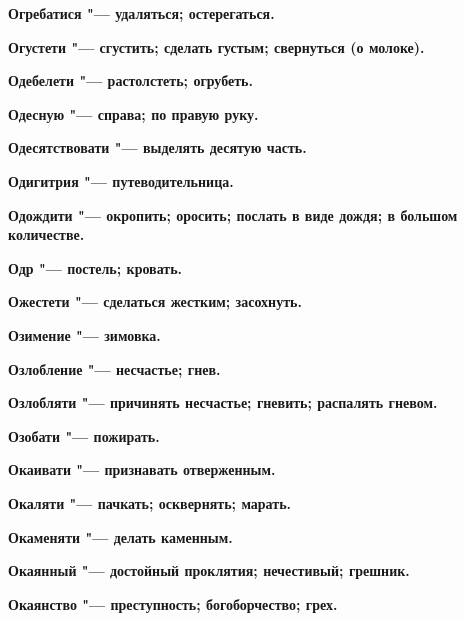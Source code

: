 \bfseries Огребатися \normalfont{} "--- удаляться; остерегаться. 




\bfseries Огустети \normalfont{} "--- сгустить; сделать густым; свернуться (о молоке). 




\bfseries Одебелети \normalfont{} "--- растолстеть; огрубеть. 




\bfseries Одесную \normalfont{} "--- справа; по правую руку. 




\bfseries Одесятствовати \normalfont{} "--- выделять десятую часть. 




\bfseries Одигитрия \normalfont{} "--- путеводительница. 




\bfseries Одождити \normalfont{} "--- окропить; оросить; послать в виде дождя; в большом количестве. 




\bfseries Одр \normalfont{} "--- постель; кровать. 




\bfseries Ожестети \normalfont{} "--- сделаться жестким; засохнуть. 




\bfseries Озимение \normalfont{} "--- зимовка. 




\bfseries Озлобление \normalfont{} "--- несчастье; гнев. 




\bfseries Озлобляти \normalfont{} "--- причинять несчастье; гневить; распалять гневом. 




\bfseries Озобати \normalfont{} "--- пожирать. 




\bfseries Окаивати \normalfont{} "--- признавать отверженным. 




\bfseries Окаляти \normalfont{} "--- пачкать; осквернять; марать. 




\bfseries Окаменяти \normalfont{} "--- делать каменным. 




\bfseries Окаянный \normalfont{} "--- достойный проклятия; нечестивый; грешник. 




\bfseries Окаянство \normalfont{} "--- преступность; богоборчество; грех. 





